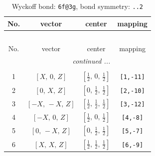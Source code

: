 \documentclass[fleqn,8pt]{jsarticle}
\begin{document}
\begin{longtable}{cccc}
\caption{Wyckoff bond: {\tt 6f@3g}, bond symmetry: {\tt ..2}}
 \\
 \hline \hline
No. & vector & center & mapping \\ \hline \endfirsthead

\multicolumn{3}{l}{\tablename\ \thetable{}} \\
 \hline \hline
No. & vector & center & mapping \\ \hline \endhead

 \hline \hline
\multicolumn{3}{r}{\footnotesize\it continued ...} \\ \endfoot

 \hline \hline
\multicolumn{3}{r}{} \\ \endlastfoot

1 & $\left[ X,\, 0,\, Z \right]$ & $\left[ \frac{1}{2},\, 0,\, \frac{1}{2} \right]$ & {\tt [1,-11]} \\ \hline
2 & $\left[ 0,\, X,\, Z \right]$ & $\left[ 0,\, \frac{1}{2},\, \frac{1}{2} \right]$ & {\tt [2,-10]} \\ \hline
3 & $\left[ - X,\, - X,\, Z \right]$ & $\left[ \frac{1}{2},\, \frac{1}{2},\, \frac{1}{2} \right]$ & {\tt [3,-12]} \\ \hline
4 & $\left[ - X,\, 0,\, Z \right]$ & $\left[ \frac{1}{2},\, 0,\, \frac{1}{2} \right]$ & {\tt [4,-8]} \\ \hline
5 & $\left[ 0,\, - X,\, Z \right]$ & $\left[ 0,\, \frac{1}{2},\, \frac{1}{2} \right]$ & {\tt [5,-7]} \\ \hline
6 & $\left[ X,\, X,\, Z \right]$ & $\left[ \frac{1}{2},\, \frac{1}{2},\, \frac{1}{2} \right]$ & {\tt [6,-9]} \\
\end{longtable}
\renewcommand{\arraystretch}{1.2}
\end{document}
